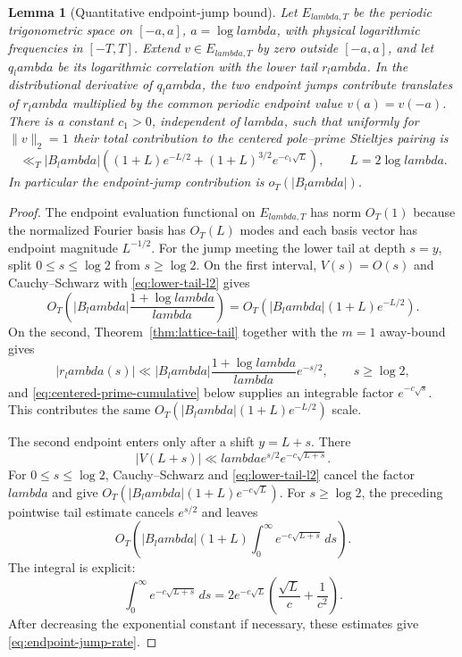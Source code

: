 \documentclass[11pt]{article}
\def\lambda{lambda}%
\newtheorem{lemma}[theorem]{Lemma}
\theoremstyle{remark}
\begin{document}
\begin{lemma}[Quantitative endpoint-jump bound]\label{lem:endpoint-jumps}
Let $E_{\lambda,T}$ be the periodic trigonometric space on $[-a,a]$, $a=\log\lambda$, with physical logarithmic frequencies in $[-T,T]$.  Extend $v\in E_{\lambda,T}$ by zero outside $[-a,a]$, and let $q_\lambda$ be its logarithmic correlation with the lower tail $r_\lambda$.  In the distributional derivative of $q_\lambda$, the two endpoint jumps contribute translates of $r_\lambda$ multiplied by the common periodic endpoint value $v(a)=v(-a)$.  There is a constant $c_1>0$, independent of $\lambda$, such that uniformly for $\|v\|_2=1$ their total contribution to the centered pole--prime Stieltjes pairing is
\begin{equation}\label{eq:endpoint-jump-rate}
 \ll_T |B_\lambda|\left((1+L)e^{-L/2}
 +(1+L)^{3/2}e^{-c_1\sqrt L}\right),
 \qquad L=2\log\lambda.
\end{equation}
In particular the endpoint-jump contribution is $o_T(|B_\lambda|)$.
\end{lemma}
\begin{proof}
The endpoint evaluation functional on $E_{\lambda,T}$ has norm $O_T(1)$ because the normalized Fourier basis has $O_T(L)$ modes and each basis vector has endpoint magnitude $L^{-1/2}$.  For the jump meeting the lower tail at depth $s=y$, split $0\le s\le\log2$ from $s\ge\log2$.  On the first interval, $V(s)=O(s)$ and Cauchy--Schwarz with \eqref{eq:lower-tail-l2} gives
\[
 O_T\!\left(|B_\lambda|\frac{1+\log\lambda}{\lambda}\right)
 =O_T\!\left(|B_\lambda|(1+L)e^{-L/2}\right).
\]
On the second, Theorem~\ref{thm:lattice-tail} together with the $m=1$ away-bound gives
\[
 |r_\lambda(s)|\ll |B_\lambda|\frac{1+\log\lambda}{\lambda}e^{-s/2},
 \qquad s\ge\log2,
\]
and \eqref{eq:centered-prime-cumulative} below supplies an integrable factor $e^{-c\sqrt s}$.  This contributes the same $O_T(|B_\lambda|(1+L)e^{-L/2})$ scale.

The second endpoint enters only after a shift $y=L+s$.  There
\[
 |V(L+s)|\ll \lambda e^{s/2}e^{-c\sqrt{L+s}}.
\]
For $0\le s\le\log2$, Cauchy--Schwarz and \eqref{eq:lower-tail-l2} cancel the factor $\lambda$ and give
$O_T(|B_\lambda|(1+L)e^{-c\sqrt L})$.  For $s\ge\log2$, the preceding pointwise tail estimate cancels $e^{s/2}$ and leaves
\[
 O_T\!\left(|B_\lambda|(1+L)
 \int_0^\infty e^{-c\sqrt{L+s}}\,ds\right).
\]
The integral is explicit:
\[
 \int_0^\infty e^{-c\sqrt{L+s}}\,ds
 =2e^{-c\sqrt L}\left(\frac{\sqrt L}{c}+\frac1{c^2}\right).
\]
After decreasing the exponential constant if necessary, these estimates give \eqref{eq:endpoint-jump-rate}.
\end{proof}
\end{document}
